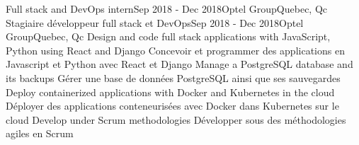 \documentclass[letterpaper,11pt]{resume}
\begin{document}
    \resumeSubheadingEnFr
      {Full stack and DevOps intern}{Sep 2018 - Dec 2018}{Optel Group}{Quebec, Qc}
      {Stagiaire développeur full stack et DevOps}{Sep 2018 - Dec 2018}{Optel Group}{Quebec, Qc}
        \resumeItemEnFr
            {Design and code full stack applications with JavaScript, Python using React and Django}
            {Concevoir et programmer des applications en Javascript et Python avec React et Django}
        \resumeItemEnFr
            {Manage a PostgreSQL database and its backups}
            {Gérer une base de données PostgreSQL ainsi que ses sauvegardes}
        \resumeItemEnFr
            {Deploy containerized applications with Docker and Kubernetes in the cloud}
            {Déployer des applications conteneurisées avec Docker dans Kubernetes sur le cloud}
        \resumeItemEnFr
            {Develop under Scrum methodologies}
            {Développer sous des méthodologies agiles en Scrum}
    \resumeSubHeadingListEnd
\end{document}

